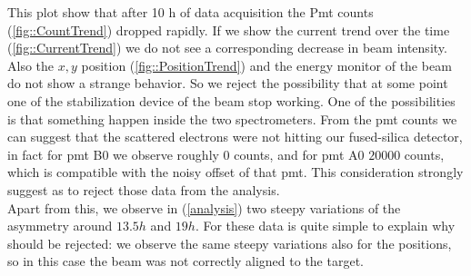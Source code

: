 This plot show that after 10 h of data acquisition the Pmt counts (\ref{fig::CountTrend}) dropped rapidly. If we show the current trend over the time (\ref{fig::CurrentTrend}) we do not see a corresponding decrease in beam intensity. Also the $x,y$ position (\ref{fig::PositionTrend}) and the energy monitor of the beam do not show a strange behavior. So we reject the possibility that at some point one of the stabilization device of the beam stop working. One of the possibilities is that something happen inside the two spectrometers. From the pmt counts we can suggest that the scattered electrons were not hitting our fused-silica detector,
in fact for pmt B0 we observe roughly 0 counts, and for pmt A0 $20000$ counts, which is compatible with the noisy offset of that pmt. This consideration strongly suggest as to reject those data from the analysis.\\
Apart from this, we observe in (\ref{analysis}) two steepy variations of the asymmetry around $13.5 h$ and $19 h$. For these data is quite simple to explain why should be rejected: we observe the same steepy variations also for the positions, so in this case the beam was not correctly aligned to the target.

\begin{figure}[hbtp]
\centering
{}
\end{figure}

